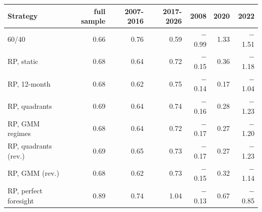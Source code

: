 \begin{tabular}{lrrrrrr}
\toprule
Strategy & full sample & 2007-2016 & 2017-2026 & 2008 & 2020 & 2022 \\
\midrule
60/40 & 0.66 & 0.76 & 0.59 & $-$0.99 & 1.33 & $-$1.51 \\
RP, static & 0.68 & 0.64 & 0.72 & $-$0.15 & 0.36 & $-$1.18 \\
RP, 12-month & 0.68 & 0.62 & 0.75 & $-$0.14 & 0.17 & $-$1.04 \\
RP, quadrants & 0.69 & 0.64 & 0.74 & $-$0.16 & 0.28 & $-$1.23 \\
RP, GMM regimes & 0.68 & 0.64 & 0.72 & $-$0.17 & 0.27 & $-$1.20 \\
RP, quadrants (rev.) & 0.69 & 0.65 & 0.73 & $-$0.17 & 0.27 & $-$1.23 \\
RP, GMM (rev.) & 0.68 & 0.62 & 0.73 & $-$0.15 & 0.32 & $-$1.14 \\
RP, perfect foresight & 0.89 & 0.74 & 1.04 & $-$0.13 & 0.67 & $-$0.85 \\
\bottomrule
\end{tabular}
